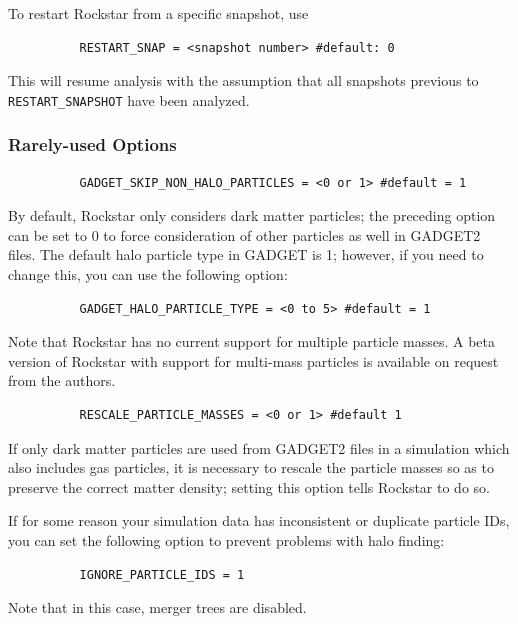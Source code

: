 \documentclass[12pt]{article}
\begin{document}
	To restart Rockstar from a specific snapshot, use
\begin{verbatim}
      	  RESTART_SNAP = <snapshot number> #default: 0
\end{verbatim}
	This will resume analysis with the assumption that all snapshots previous to \texttt{RESTART\_SNAPSHOT} have been analyzed.

\subsubsection{Rarely-used Options}
\begin{verbatim}
      	  GADGET_SKIP_NON_HALO_PARTICLES = <0 or 1> #default = 1
\end{verbatim}
      By default, Rockstar only considers dark matter particles; the preceding
      option can be set to 0 to force consideration of other particles as well
      in GADGET2 files.  The default halo particle type in GADGET is 1; however,
      if you need to change this, you can use the following option:
\begin{verbatim}
          GADGET_HALO_PARTICLE_TYPE = <0 to 5> #default = 1
\end{verbatim}
      Note that Rockstar has no current support for multiple particle masses.  A beta version of Rockstar with support for multi-mass particles is available on request from the authors.
\begin{verbatim}
      	  RESCALE_PARTICLE_MASSES = <0 or 1> #default 1
\end{verbatim}
      If only dark matter particles are used from GADGET2 files in a simulation
      which also includes gas particles, it is necessary to rescale the particle
      masses so as to preserve the correct matter density; setting this option
      tells Rockstar to do so.

      If for some reason your simulation data has inconsistent or duplicate
      particle IDs, you can set the following option to prevent problems with
      halo finding:
\begin{verbatim}
          IGNORE_PARTICLE_IDS = 1
\end{verbatim}
      Note that in this case, merger trees are disabled.
\end{document}
